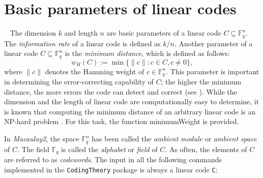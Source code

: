 \documentclass[12pt]{amsart}
\theoremstyle{plain}
\begin{document}
\section{Basic parameters of linear codes}~\label{pro}
The dimension $k$ and length $n$ are basic parameters of a linear code $C\subseteq \mathbb{F}^n_q$. The {\it information rate} of a linear code is defined as $k/n$. Another parameter of a linear code $C\subseteq \mathbb{F}^n_q$ is the {\it minimum distance}, which is defined as follows:
\[
w_H(C):=\min\{\|c\|
\colon  c \in C, c \neq 0\},
\]
where $\| c \|$ denotes the Hamming weight of $c\in \mathbb{F}^n_q$. This parameter is important in determining the error-correcting capability of $C$; the higher the minimum distance, the more errors the code can detect and correct (see \cite{huf-pless}). 
While the dimension and the length of linear code are computationally easy to determine, it is known that computing the minimum distance of an arbitrary linear code is an NP-hard problem \cite{Vardy}. For this task, the function {\ttfamily minimumWeight} is provided. 

In {\it Macaulay2}, the space $\mathbb{F}_q^n$ has been called the {\it ambient module} or {\it ambient space} of $C$. The field $\mathbb{F}_q$ is called the {\it alphabet} or {\it field} of $C$. As often, the elements of $C$ are referred to as {\it codewords}. The input in all the following commands implemented in the {\tt CodingTheory} package is always a linear code  {\tt C}:
 
\medskip
  
\end{document}
